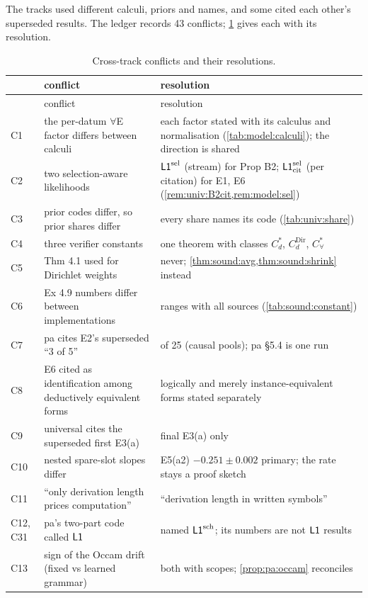 The tracks used different calculi, priors and names, and some cited each other's superseded results. The ledger records 43 conflicts; \cref{tab:ver:conflicts} gives each with its resolution.

{\footnotesize
\begin{longtable}{@{}l>{\raggedright\arraybackslash}p{6.0cm}>{\raggedright\arraybackslash}p{7.7cm}@{}}
\caption{Cross-track conflicts and their resolutions.}\label{tab:ver:conflicts}\\
\toprule
& conflict & resolution\\
\midrule
\endfirsthead
\toprule
& conflict & resolution\\
\midrule
\endhead
\bottomrule
\endfoot
C1 & the per-datum $\forall$E factor differs between calculi & each factor stated with its calculus and normalisation (\cref{tab:model:calculi}); the direction is shared\\
C2 & two selection-aware likelihoods & $\mathord{\mathsf{L1}}^{\mathrm{sel}}$ (stream) for Prop B2; $\mathord{\mathsf{L1}}^{\mathrm{sel}}_{\mathrm{cit}}$ (per citation) for E1, E6 (\cref{rem:univ:B2cit,rem:model:sel})\\
C3 & prior codes differ, so prior shares differ & every share names its code (\cref{tab:univ:share})\\
C4 & three verifier constants & one theorem with classes $C^*_d$, $C^{\mathrm{Dir}}_d$, $C^*_\forall$\\
C5 & Thm 4.1 used for Dirichlet weights & never; \cref{thm:sound:avg,thm:sound:shrink} instead\\
C6 & Ex 4.9 numbers differ between implementations & ranges with all sources (\cref{tab:sound:constant})\\
C7 & pa cites E2's superseded ``3 of 5'' & 5 of 25 (causal pools); pa \S5.4 is one run\\
C8 & E6 cited as identification among deductively equivalent forms & logically and merely instance-equivalent forms stated separately\\
C9 & universal cites the superseded first E3(a) & final E3(a) only\\
C10 & nested spare-slot slopes differ & E5(a2) $-0.251\pm0.002$ primary; the rate stays a proof sketch\\
C11 & ``only derivation length prices computation'' & ``derivation length in written symbols''\\
C12, C31 & pa's two-part code called $\mathord{\mathsf{L1}}$ & named $\mathord{\mathsf{L1}}^{\mathrm{sch}}$; its numbers are not $\mathord{\mathsf{L1}}$ results\\
C13 & sign of the Occam drift (fixed vs learned grammar) & both with scopes; \cref{prop:pa:occam} reconciles\\

\end{longtable}}
